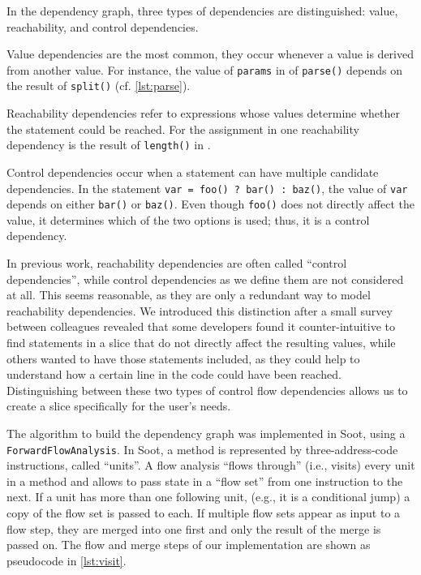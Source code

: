 In the dependency graph, three types of dependencies are distinguished: value, reachability, and control dependencies.

Value dependencies are the most common, they occur whenever a value is derived from another value.
For instance, the value of \verb+params+ in  of \verb+parse()+ depends on the result of \verb+split()+ (cf. \autoref{lst:parse}).

Reachability dependencies refer to expressions whose values determine whether the statement could be reached.
For the assignment in  one reachability dependency is the result of \verb+length()+ in .

Control dependencies occur when a statement can have multiple candidate dependencies.
In the statement \lstinline{var = foo() ? bar() : baz()}, the value of \verb+var+ depends on either \verb+bar()+ or \verb+baz()+.
Even though \verb+foo()+ does not directly affect the value, it determines which of the two options is used; thus, it is a control dependency.

In previous work, reachability dependencies are often called ``control dependencies'', while control dependencies as we define them are not considered at all. 
This seems reasonable, as they are only a redundant way to model reachability dependencies.
We introduced this distinction after a small survey between colleagues revealed that some developers found it counter-intuitive to find statements in a slice that do not directly affect the resulting values, while others wanted to have those statements included, as they could help to understand how a certain line in the code could have been reached.
Distinguishing between these two types of control flow dependencies allows us to create a slice specifically for the user's needs.

The algorithm to build the dependency graph was implemented in Soot, using a \verb+ForwardFlowAnalysis+.
In Soot, a method is represented by three-address-code instructions, called ``units''.
A flow analysis ``flows through'' (i.e., visits) every unit in a method and allows to pass state in a ``flow set'' from one instruction to the next.
If a unit has more than one following unit, (e.g., it is a conditional jump) a copy of the flow set is passed to each.
If multiple flow sets appear as input to a flow step, they are merged into one first and only the result of the merge is passed on.
The flow and merge steps of our implementation are shown as pseudocode in \autoref{lst:visit}.


